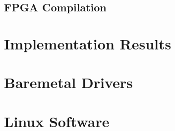 \documentclass{ug}
\begin{document}
\subsection{FPGA Compilation}
\label{sec:fpga}


\ifdefined\RESULTS
\ifdefined\SECTIONCLEARPAGE
\clearpage
\fi
\section{Implementation Results}
\label{sec:results}

\fi

\ifdefined\DOXYGEN
\section{Baremetal Drivers}
\label{sec:baremetal}

\fi

\ifdefined\LINUX
\section{Linux Software}
\label{sec:linux}

\fi

\ifdefined\CUSTOM

\fi
\end{document}
